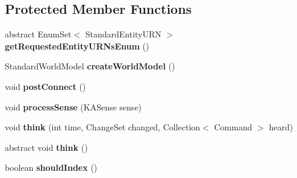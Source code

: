 \subsection*{Protected Member Functions}
\begin{DoxyCompactItemize}
\item 
\hypertarget{classadf_1_1agent_1_1Agent_a311ff9a9ad4a99ced51102f2083a7780}{}\label{classadf_1_1agent_1_1Agent_a311ff9a9ad4a99ced51102f2083a7780} 
abstract Enum\+Set$<$ Standard\+Entity\+U\+RN $>$ {\bfseries get\+Requested\+Entity\+U\+R\+Ns\+Enum} ()
\item 
\hypertarget{classadf_1_1agent_1_1Agent_aa6b4050401a515f48021b1813ea10688}{}\label{classadf_1_1agent_1_1Agent_aa6b4050401a515f48021b1813ea10688} 
Standard\+World\+Model {\bfseries create\+World\+Model} ()
\item 
\hypertarget{classadf_1_1agent_1_1Agent_ae831d47d081d9b343ec6c65e99de740f}{}\label{classadf_1_1agent_1_1Agent_ae831d47d081d9b343ec6c65e99de740f} 
void {\bfseries post\+Connect} ()
\item 
\hypertarget{classadf_1_1agent_1_1Agent_a69c3456b3351a085b5d959e6929cf2fe}{}\label{classadf_1_1agent_1_1Agent_a69c3456b3351a085b5d959e6929cf2fe} 
void {\bfseries process\+Sense} (K\+A\+Sense sense)
\item 
\hypertarget{classadf_1_1agent_1_1Agent_a747001153f5d19bc89d6aa5d343250a6}{}\label{classadf_1_1agent_1_1Agent_a747001153f5d19bc89d6aa5d343250a6} 
void {\bfseries think} (int time, Change\+Set changed, Collection$<$ Command $>$ heard)
\item 
\hypertarget{classadf_1_1agent_1_1Agent_aedd52af7190bca51de58f182aacc3cfe}{}\label{classadf_1_1agent_1_1Agent_aedd52af7190bca51de58f182aacc3cfe} 
abstract void {\bfseries think} ()
\item 
\hypertarget{classadf_1_1agent_1_1Agent_a20be2c96d7b14136d354a84f45067410}{}\label{classadf_1_1agent_1_1Agent_a20be2c96d7b14136d354a84f45067410} 
boolean {\bfseries should\+Index} ()
\end{DoxyCompactItemize}
